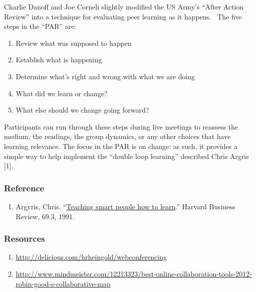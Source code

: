 Charlie Danoff and Joe Corneli slightly modified the US Army's ``After
Action Review'' into a technique for evaluating peer learning as it
happens.~ The five steps in the ``PAR'' are:

\begin{enumerate}
\def\labelenumi{\arabic{enumi}.}
\item
  Review what was supposed to happen
\item
  Establish what is happening
\item
  Determine what's right and wrong with what we are doing
\item
  What did we learn or change?
\item
  What else should we change going forward?
\end{enumerate}

Participants can run through these steps during live meetings to
reassess the medium, the readings, the group dynamics, or any other
choices that have learning relevance. The focus in the PAR is on change:
as such, it provides a simple way to help implement the ``double loop
learning'' described Chris Argris {{[}1{]}}.

\hypertarget{reference}{%
\subsubsection{Reference}\label{reference}}

\begin{enumerate}
\def\labelenumi{\arabic{enumi}.}
\tightlist
\item
  Argyris, Chris.
  ``\href{http://pds8.egloos.com/pds/200805/20/87/chris_argyris_learning.pdf}{Teaching
  smart people how to learn}.'' Harvard Business Review, 69.3, 1991.
\end{enumerate}

\hypertarget{resources}{%
\subsubsection{Resources}\label{resources}}

\begin{enumerate}
\def\labelenumi{\arabic{enumi}.}
\item
  {\url{http://delicious.com/hrheingold/webconferencing}}
\item
  {\url{http://www.mindmeister.com/12213323/best-online-collaboration-tools-2012-robin-good-s-collaborative-map}}
\end{enumerate}
